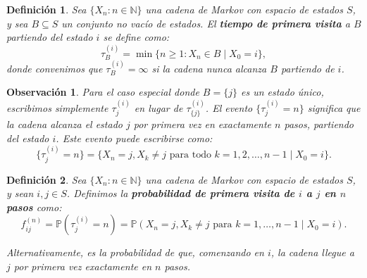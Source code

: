\documentclass[12pt]{book}
\newtheorem{definition}{Definición}[chapter]
\newtheorem{remark}{Observación}[chapter]
\begin{document}
\begin{definition}
Sea $\{X_n : n \in \mathbb{N}\}$ una cadena de Markov con espacio de estados $S$, y sea $B \subseteq S$ un conjunto no vacío de estados. El \textbf{tiempo de primera visita} a $B$ partiendo del estado $i$ se define como:
\[
\tau_B^{(i)} = \min\{n \geq 1 : X_n \in B \mid X_0 = i\},
\]
donde convenimos que $\tau_B^{(i)} = \infty$ si la cadena nunca alcanza $B$ partiendo de $i$.
\end{definition}

\begin{remark}
Para el caso especial donde $B = \{j\}$ es un estado único, escribimos simplemente $\tau_j^{(i)}$ en lugar de $\tau_{\{j\}}^{(i)}$. El evento $\{\tau_j^{(i)} = n\}$ significa que la cadena alcanza el estado $j$ por primera vez en exactamente $n$ pasos, partiendo del estado $i$. Este evento puede escribirse como:
\[
\{\tau_j^{(i)} = n\} = \{X_n = j, X_k \neq j \text{ para todo } k = 1, 2, \ldots, n-1 \mid X_0 = i\}.
\]
\end{remark}

\begin{definition}
Sea $\{X_n : n \in \mathbb{N}\}$ una cadena de Markov con espacio de estados $S$, y sean $i, j \in S$. Definimos la \textbf{probabilidad de primera visita de $i$ a $j$ en $n$ pasos} como:
\[
f_{ij}^{(n)} = \mathbb{P}(\tau_j^{(i)} = n) = \mathbb{P}(X_n = j, X_k \neq j \text{ para } k = 1, \ldots, n-1 \mid X_0 = i).
\]

Alternativamente, es la probabilidad de que, comenzando en $i$, la cadena llegue a $j$ por primera vez exactamente en $n$ pasos.
\end{definition}
\end{document}
